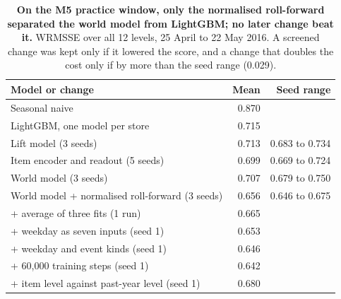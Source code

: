 \begin{table}[t]
\centering
\caption{\textbf{On the M5 practice window, only the normalised roll-forward separated the world model from
LightGBM; no later change beat it.} WRMSSE over all 12 levels, 25 April to 22 May 2016. A screened change
was kept only if it lowered the score, and a change that doubles the cost only if by more than the seed
range (0.029).}
\label{tab:m5dev}
\footnotesize
\begin{tabular}{p{}rr}
\toprule
\textbf{Model or change} & \textbf{Mean} & \textbf{Seed range} \\
\midrule
Seasonal naive & 0.870 &  \\
LightGBM, one model per store & 0.715 &  \\
Lift model (3 seeds) & 0.713 & 0.683 to 0.734 \\
Item encoder and readout (5 seeds) & 0.699 & 0.669 to 0.724 \\
World model (3 seeds) & 0.707 & 0.679 to 0.750 \\
World model + normalised roll-forward (3 seeds) & 0.656 & 0.646 to 0.675 \\
+ average of three fits (1 run) & 0.665 &  \\
+ weekday as seven inputs (seed 1) & 0.653 &  \\
+ weekday and event kinds (seed 1) & 0.646 &  \\
+ 60,000 training steps (seed 1) & 0.642 &  \\
+ item level against past-year level (seed 1) & 0.680 &  \\
\bottomrule
\end{tabular}
\end{table}
